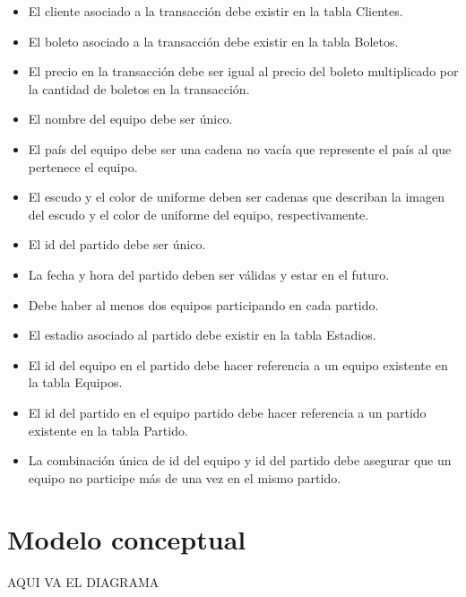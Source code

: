 \begin{itemize}
    \item El cliente asociado a la transacción debe existir en la tabla Clientes.
    \item El boleto asociado a la transacción debe existir en la tabla Boletos.
    \item El precio en la transacción debe ser igual al precio del boleto multiplicado por la cantidad de boletos en la transacción.
    \item El nombre del equipo debe ser único.
    \item El país del equipo debe ser una cadena no vacía que represente el país al que pertenece el equipo.
    \item El escudo y el color de uniforme deben ser cadenas que describan la imagen del escudo y el color de uniforme del equipo, respectivamente.
    \item El id del partido debe ser único.
    \item La fecha y hora del partido deben ser válidas y estar en el futuro.
    \item Debe haber al menos dos equipos participando en cada partido.
    \item El estadio asociado al partido debe existir en la tabla Estadios.
    \item El id del equipo en el partido debe hacer referencia a un equipo existente en la tabla Equipos.
    \item El id del partido en el equipo partido debe hacer referencia a un partido existente en la tabla Partido.
    \item La combinación única de id del equipo y id del partido debe asegurar que un equipo no participe más de una vez en el mismo partido.
\end{itemize}


\section{Modelo conceptual}

\begin{center}
    AQUI VA EL DIAGRAMA 
\end{center}

